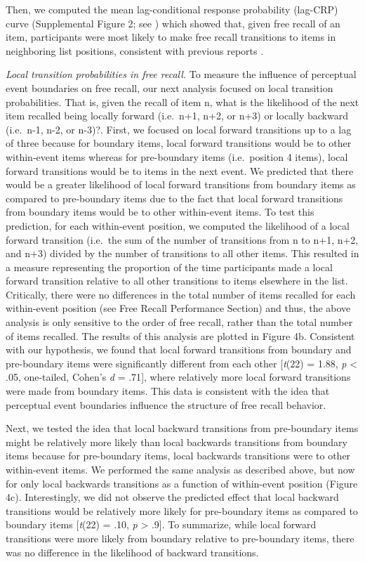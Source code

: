 Then, we computed the mean lag-conditional response probability
(lag-CRP) curve (Supplemental Figure 2; see
\autocite{kahana_associative_1996}) which showed that, given free recall
of an item, participants were most likely to make free recall
transitions to items in neighboring list positions, consistent with
previous reports
\autocites{howard_distributed_2002}{kahana_associative_1996}.

\emph{Local transition probabilities in free recall.} To measure the
influence of perceptual event boundaries on free recall, our next
analysis focused on local transition probabilities. That is, given the
recall of item n, what is the likelihood of the next item recalled being
locally forward (i.e.~n+1, n+2, or n+3) or locally backward (i.e.~n-1,
n-2, or n-3)?. First, we focused on local forward transitions up to a
lag of three because for boundary items, local forward transitions would
be to other within-event items whereas for pre-boundary items
(i.e.~position 4 items), local forward transitions would be to items in
the next event. We predicted that there would be a greater likelihood of
local forward transitions from boundary items as compared to
pre-boundary items due to the fact that local forward transitions from
boundary items would be to other within-event items. To test this
prediction, for each within-event position, we computed the likelihood
of a local forward transition (i.e.~the sum of the number of transitions
from n to n+1, n+2, and n+3) divided by the number of transitions to all
other items. This resulted in a measure representing the proportion of
the time participants made a local forward transition relative to all
other transitions to items elsewhere in the list. Critically, there were
no differences in the total number of items recalled for each
within-event position (see Free Recall Performance Section) and thus,
the above analysis is only sensitive to the order of free recall, rather
than the total number of items recalled. The results of this analysis
are plotted in Figure 4b. Consistent with our hypothesis, we found that
local forward transitions from boundary and pre-boundary items were
significantly different from each other {[}\emph{t}(22) = 1.88, \emph{p}
\textless{} .05, one-tailed, Cohen's \emph{d} = .71{]}, where relatively
more local forward transitions were made from boundary items. This data
is consistent with the idea that perceptual event boundaries influence
the structure of free recall behavior.

Next, we tested the idea that local backward transitions from
pre-boundary items might be relatively more likely than local backwards
transitions from boundary items because for pre-boundary items, local
backwards transitions were to other within-event items. We performed the
same analysis as described above, but now for only local backwards
transitions as a function of within-event position (Figure 4c).
Interestingly, we did not observe the predicted effect that local
backward transitions would be relatively more likely for pre-boundary
items as compared to boundary items {[}\emph{t}(22) = .10, \emph{p}
\textgreater{} .9{]}. To summarize, while local forward transitions were
more likely from boundary relative to pre-boundary items, there was no
difference in the likelihood of backward transitions.

